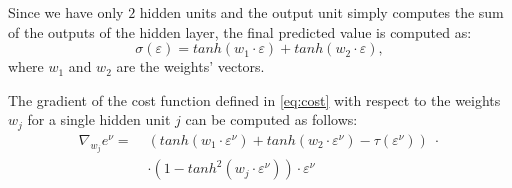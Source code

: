 Since we have only $2$ hidden units and the output unit simply computes the sum of the outputs of the hidden layer, the final predicted value is computed as:
\begin{equation}
    \sigma (\varepsilon) = tanh(w_1 \cdot \varepsilon) + tanh(w_2 \cdot \varepsilon),
\end{equation}
where $w_1$ and $w_2$ are the weights' vectors.

The gradient of the cost function defined in \cref{eq:cost} with respect to the weights $w_j$ for a single hidden unit $j$ can be computed as follows:
\begin{equation}
    \label{eq:gradient-gen-weight}
    \begin{split}
        \nabla_{w_j} e^\nu =\; & (tanh(w_1 \cdot \varepsilon^\nu) + tanh(w_2 \cdot \varepsilon^\nu) - \tau(\varepsilon^\nu)) \; \cdot \\
        & \cdot (1 - tanh^2(w_j \cdot \varepsilon^\nu)) \cdot \varepsilon^\nu
    \end{split}
\end{equation}

